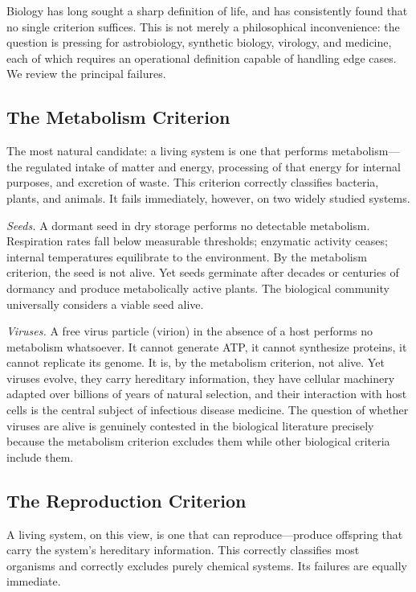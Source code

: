 Biology has long sought a sharp definition of life, and has consistently found
that no single criterion suffices. This is not merely a philosophical inconvenience:
the question is pressing for astrobiology, synthetic biology, virology, and
medicine, each of which requires an operational definition capable of handling
edge cases. We review the principal failures.

\subsection{The Metabolism Criterion}

The most natural candidate: a living system is one that performs metabolism---
the regulated intake of matter and energy, processing of that energy for
internal purposes, and excretion of waste. This criterion correctly classifies
bacteria, plants, and animals. It fails immediately, however, on two widely
studied systems.

\medskip
\noindent\textit{Seeds.} A dormant seed in dry storage performs no detectable
metabolism. Respiration rates fall below measurable thresholds; enzymatic
activity ceases; internal temperatures equilibrate to the environment. By the
metabolism criterion, the seed is not alive. Yet seeds germinate after decades
or centuries of dormancy and produce metabolically active plants. The biological
community universally considers a viable seed alive.

\medskip
\noindent\textit{Viruses.} A free virus particle (virion) in the absence of a
host performs no metabolism whatsoever. It cannot generate ATP, it cannot
synthesize proteins, it cannot replicate its genome. It is, by the metabolism
criterion, not alive. Yet viruses evolve, they carry hereditary information,
they have cellular machinery adapted over billions of years of natural
selection, and their interaction with host cells is the central subject of
infectious disease medicine. The question of whether viruses are alive is
genuinely contested in the biological literature precisely because the
metabolism criterion excludes them while other biological criteria include them.

\subsection{The Reproduction Criterion}

A living system, on this view, is one that can reproduce---produce offspring
that carry the system's hereditary information. This correctly classifies most
organisms and correctly excludes purely chemical systems. Its failures are
equally immediate.

